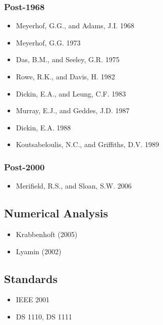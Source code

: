 \documentclass[a4paper, nobind]{templates/ociamthesis}
\providecommand{\tightlist}{%
  \setlength{\itemsep}{0pt}\setlength{\parskip}{0pt}}
\begin{document}
\hypertarget{post-1968}{%
\subsubsection{Post-1968}\label{post-1968}}

\begin{itemize}
\tightlist
\item
  Meyerhof, G.G., and Adams, J.I. 1968
\item
  Meyerhof, G.G. 1973
\item
  Das, B.M., and Seeley, G.R. 1975
\item
  Rowe, R.K., and Davis, H. 1982
\item
  Dickin, E.A., and Leung, C.F. 1983
\item
  Murray, E.J., and Geddes, J.D. 1987
\item
  Dickin, E.A. 1988
\item
  Koutsabeloulis, N.C., and Griffiths, D.V. 1989
\end{itemize}

\hypertarget{post-2000}{%
\subsubsection{Post-2000}\label{post-2000}}

\begin{itemize}
\tightlist
\item
  Merifield, R.S., and Sloan, S.W. 2006
\end{itemize}

\hypertarget{numerical-analysis}{%
\subsection{Numerical Analysis}\label{numerical-analysis}}

\begin{itemize}
\tightlist
\item
  Krabbenhoft (2005)
\item
  Lyamin (2002)
\end{itemize}

\hypertarget{standards}{%
\subsection{Standards}\label{standards}}

\begin{itemize}
\tightlist
\item
  IEEE 2001
\item
  DS 1110, DS 1111
\end{itemize}
\end{document}

